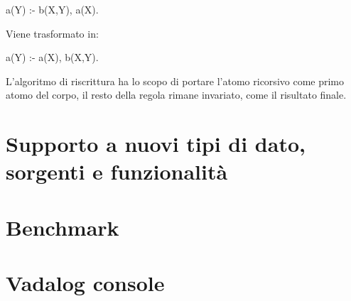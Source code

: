 \begin{algorithm}
	a(Y) :- b(X,Y), a(X).
\end{algorithm}

Viene trasformato in:

\begin{algorithm}
	a(Y) :- a(X), b(X,Y).
\end{algorithm}

L'algoritmo di riscrittura ha lo scopo di portare l'atomo ricorsivo come primo atomo del corpo, il resto della regola rimane invariato, come il risultato finale.

\section{Supporto a nuovi tipi di dato, sorgenti e funzionalità}

\section{Benchmark}

\section{Vadalog console}